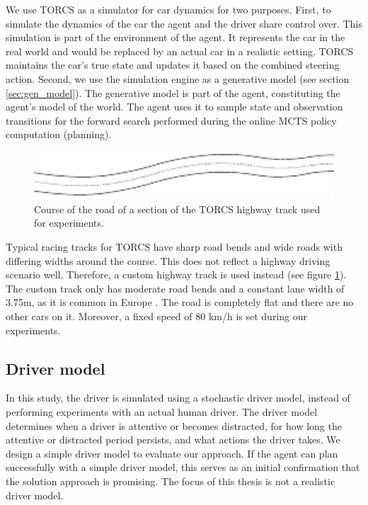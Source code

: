 We use TORCS as a simulator for car dynamics for two purposes. First, to simulate the dynamics of the car the agent and the driver share control over. This simulation is part of the environment of the agent. It represents the car in the real world and would be replaced by an actual car in a realistic setting. TORCS maintains the car's true state and updates it based on the combined steering action. Second, we use the simulation engine as a generative model (see section \ref{sec:gen_model}). The generative model is part of the agent, constituting the agent's model of the world. The agent uses it to sample state and observation transitions for the forward search performed during the online MCTS policy computation (planning).
 
\begin{figure}[htbp]
    \centerfloat
    \includegraphics[width=1.0\textwidth]{figures/track.pdf}
    \caption{Course of the road of a section of the TORCS highway track used for experiments.}
    \label{fig:track}
\end{figure}

Typical racing tracks for TORCS have sharp road bends and wide roads with differing widths around the course. This does not reflect a highway driving scenario well. Therefore, a custom highway track is used instead (see figure \ref{fig:track}). The custom track only has moderate road bends and a constant lane width of 3.75m, as it is common in Europe \parencite{lane_width}. The road is completely flat and there are no other cars on it. Moreover, a fixed speed of 80 km/h is set during our experiments.

\subsection{Driver model}
\label{sec:driver_model}

In this study, the driver is simulated using a stochastic driver model, instead of performing experiments with an actual human driver. The driver model determines when a driver is attentive or becomes distracted, for how long the attentive or distracted period persists, and what actions the driver takes. We design a simple driver model to evaluate our approach. If the agent can plan successfully with a simple driver model, this serves as an initial confirmation that the solution approach is promising. The focus of this thesis is not a realistic driver model.

